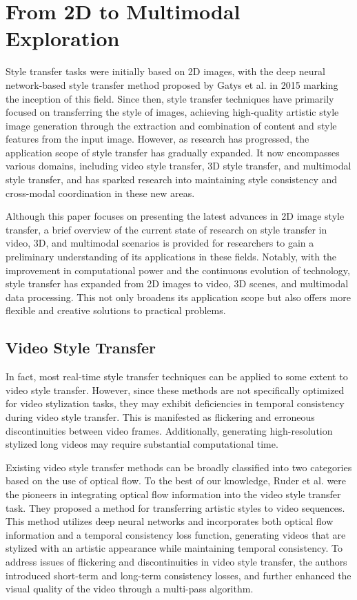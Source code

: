 \documentclass[preprint,12pt]{elsarticle}
\begin{document}
\section{From 2D to Multimodal Exploration}

Style transfer tasks were initially based on 2D images, with the deep neural network-based style transfer method proposed by Gatys et al. in 2015 marking the inception of this field. Since then, style transfer techniques have primarily focused on transferring the style of images, achieving high-quality artistic style image generation through the extraction and combination of content and style features from the input image. However, as research has progressed, the application scope of style transfer has gradually expanded. It now encompasses various domains, including video style transfer, 3D style transfer, and multimodal style transfer, and has sparked research into maintaining style consistency and cross-modal coordination in these new areas.

Although this paper focuses on presenting the latest advances in 2D image style transfer, a brief overview of the current state of research on style transfer in video, 3D, and multimodal scenarios is provided for researchers to gain a preliminary understanding of its applications in these fields. Notably, with the improvement in computational power and the continuous evolution of technology, style transfer has expanded from 2D images to video, 3D scenes, and multimodal data processing. This not only broadens its application scope but also offers more flexible and creative solutions to practical problems.

\subsection{Video Style Transfer}
In fact, most real-time style transfer techniques can be applied to some extent to video style transfer. However, since these methods are not specifically optimized for video stylization tasks, they may exhibit deficiencies in temporal consistency during video style transfer. This is manifested as flickering and erroneous discontinuities between video frames. Additionally, generating high-resolution stylized long videos may require substantial computational time.

Existing video style transfer methods can be broadly classified into two categories based on the use of optical flow. To the best of our knowledge, Ruder et al.\citep{98ruder2016artistic} were the pioneers in integrating optical flow information into the video style transfer task. They proposed a method for transferring artistic styles to video sequences. This method utilizes deep neural networks and incorporates both optical flow information and a temporal consistency loss function, generating videos that are stylized with an artistic appearance while maintaining temporal consistency. To address issues of flickering and discontinuities in video style transfer, the authors introduced short-term and long-term consistency losses, and further enhanced the visual quality of the video through a multi-pass algorithm.
\end{document}
